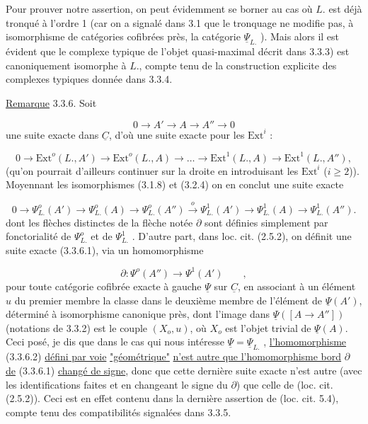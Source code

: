 Pour prouver notre assertion, on peut évidemment se borner au cas où $L.$ est déjà tronqué à l'ordre 1 (car on a signalé dans 3.1 que le tronquage ne modifie pas, à isomorphisme de catégories cofibrées près, la catégorie $\underline{\Psi}_{L.}$ ). Mais alors il est évident que le complexe typique de l'objet quasi-maximal décrit dans 3.3.3) est canoniquement isomorphe à $L.$, compte tenu de la construction explicite des complexes typiques donnée dans 3.3.4.

\underline{Remarque} 3.3.6. Soit

\begin{equation*}
0 \longrightarrow A' \longrightarrow A \longrightarrow A'' \longrightarrow 0
\end{equation*}
une suite exacte dans $\underline{C}$, d'où une suite exacte pour les $\mathrm{Ext}^i$ :

\begin{equation*}
0 \longrightarrow \mathrm{Ext}^o(L.,A') \longrightarrow \mathrm{Ext}^o(L.,A) \rightarrow \ldots \rightarrow \mathrm{Ext}^1(L.,A) \longrightarrow \mathrm{Ext}^1(L.,A''),
\end{equation*}
(qu'on pourrait d'ailleurs continuer sur la droite en introduisant les $\mathrm{Ext}^i$ ($i \geq 2$)). Moyennant les isomorphismes (3.1.8) et (3.2.4) on en conclut une suite exacte

\begin{equation}\tag{3.3.6.1}
0 \longrightarrow \Psi^o_{L.}(A') \longrightarrow \Psi^o_{L.}(A) \longrightarrow \Psi^o_{L.}(A'') \xrightarrow{\ o\ } \Psi^1_{L.}(A') \rightarrow \Psi^1_{L.}(A) \rightarrow \Psi^1_{L.}(A'').
\end{equation}
dont les flèches distinctes de la flèche notée $\partial$ sont définies simplement par fonctorialité de $\Psi^o_{L.}$ et de $\Psi^1_{L.}$ . D'autre part, dans loc. cit. (2.5.2), on définit une suite exacte (3.3.6.1), via un homomorphisme 



\begin{equation}\tag{3.3.6.2}
 \partial : \Psi^{o}(A'') \longrightarrow \Psi^{1}(A') \qquad ,
\end{equation}
pour toute catégorie cofibrée exacte à gauche $\underline{\Psi}$ sur $\underline{C}$, en associant à un élément $u$ du premier membre la classe dans le deuxième membre de l'élément de $\underline{\Psi}(A')$, déterminé à isomorphisme canonique près, dont l'image dans $\underline{\Psi}([A \longrightarrow A''])$ (notations de 3.3.2) est le couple $(X_o,u)$, où $X_o$ est l'objet trivial de $\underline{\Psi}(A)$. Ceci posé, je dis que dans le cas qui nous intéresse $\underline{\Psi} = \underline{\Psi}_{L.}$ , \underline{l'homomorphisme} (3.3.6.2) \underline{défini par voie} \underline{"géométrique"} \underline{n'est autre que l'homomorphisme bord} $\partial$ \underline{de} (3.3.6.1) \underline{changé de signe}, donc que cette dernière suite exacte n'est autre (avec les identifications faites et en changeant le signe du $\partial$) que celle de (loc. cit. (2.5.2)). Ceci est en effet contenu dans la dernière assertion de (loc. cit. 5.4), compte tenu des compatibilités signalées dans 3.3.5.

